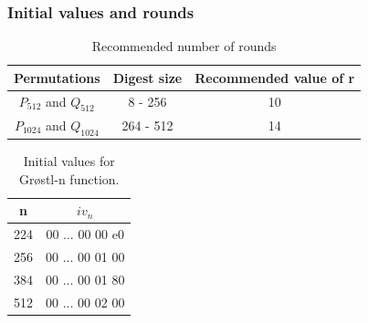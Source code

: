 \documentclass{beamer}
\begin{document}
\begin{frame}
\frametitle{Initial values and rounds \footnotemark}
\begin{table}[h]
  \begin{center}
    \begin{tabular}{ *{3}{c} } \hline
      Permutations            & Digest size & Recommended value of r \\ \hline
      $P_{512}$ and $Q_{512}$   & 8 - 256     & 10 \\
      $P_{1024}$ and $Q_{1024}$ & 264 - 512   & 14 \\ \hline 
    \end{tabular}
    \caption{Recommended number of rounds}
  \end{center}
\end{table}

\begin{table}[h]
  \begin{center}
    \begin{tabular}{ *{2}{c} } \hline
      n   & $iv_{n}$         \\ \hline
      224 & 00 $\dots$ 00 00 e0 \\
      256 & 00 $\dots$ 00 01 00 \\
      384 & 00 $\dots$ 00 01 80 \\
      512 & 00 $\dots$ 00 02 00 \\ \hline
    \end{tabular}
  \caption{Initial values for Gr{\o}stl-n function.}
  \end{center}
\end{table}
\end{frame}
\end{document}
